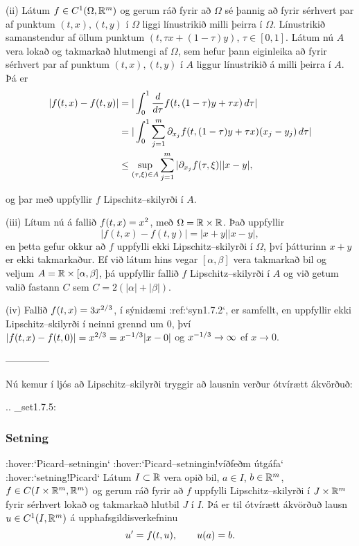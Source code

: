 \smallskip
(ii)  Látum $f\in C^{1}(\Omega,{\mathbb R}^m)$ og gerum ráð fyrir að $\Omega$ sé
þannig að fyrir sérhvert par af 
punktum $(t,x), (t,y)$ í $\Omega$  liggi línustrikið milli þeirra í $\Omega$.
Línustrikið  samanstendur af öllum punktum $(t,\tau x+(1-\tau)y)$,
$\tau\in [0,1]$. Látum nú $A$ vera lokað og takmarkað hlutmengi af
$\Omega$, sem hefur þann eiginleika að fyrir sérhvert par af punktum
$(t,x), (t,y)$ í $A$ liggur línustrikið á milli þeirra í $A$.  Þá er
\begin{align*}
|f(t,x)-f(t,y)|&=|\int_0\sp 1\dfrac d{d\tau}f(t,(1-\tau)y+\tau x) \,
d\tau|\\
&=|\int_0\sp 1 \sum\limits_{j=1}\sp m
\partial_{x_j}f(t,(1-\tau)y+\tau x)
(x_j-y_j) \, d\tau|\\
&\leq \sup\limits_{(\tau,\xi)\in A} 
\sum\limits_{j=1}\sp m |\partial_{x_j}f(\tau,\xi)||x-y|,
\end{align*}

\noindent
og þar með uppfyllir $f$ Lipschitz--skilyrði í $A$.

\smallskip
(iii)  Lítum nú á fallið $f(t,x)=x\sp 2$, með $\Omega={\mathbb R}\times {\mathbb R}$.
Það uppfyllir  $$|f(t,x)-f(t,y)|=|x+y||x-y|, 
 $$
en þetta gefur okkur að $f$ uppfylli ekki Lipschitz--skilyrði í $\Omega$, því
þátturinn $x+y$ er ekki takmarkaður.  Ef við látum hins vegar
$[\alpha,\beta]$ 
vera takmarkað bil og veljum $A={\mathbb R}\times [\alpha,\beta]$, þá
uppfyllir fallið $f$ Lipschitz--skilyrði í $A$ og við getum valið
fastann $C$ sem 
$C=2(|\alpha|+|\beta|)$.  

\smallskip
(iv) Fallið $f(t,x)=3x\sp{2/3}$, í sýnidæmi :ref:`syn1.7.2`, er samfellt, en
uppfyllir ekki
Lipschitz--skilyrði í neinni grennd um $0$, því
$|f(t,x)-f(t,0)|=x\sp{2/3}=x\sp{-1/3}|x-0|$ og $x\sp{-1/3}\to \infty$ ef
$x\to 0$.  


--------------



Nú kemur í ljós að Lipschitz--skilyrði tryggir að lausnin verður
ótvírætt ákvörð\-uð:


.. _set1.7.5:

\subsubsection{Setning}{ :hover:`Picard--setningin` :hover:`Picard--setningin!víðfeðm
útgáfa` :hover:`setning!Picard`}
Látum $I\subset {\mathbb R}$ vera opið bil, $a\in I$, $b\in {\mathbb R}\sp m$,
$f\in C(I\times {\mathbb R}\sp m,{\mathbb R}\sp m)$ og gerum ráð fyrir að $f$ uppfylli
Lipschitz--skilyrði í $J\times {\mathbb R}\sp m$ fyrir sérhvert lokað og
takmarkað hlutbil $J$ í $I$. Þá er til ótvírætt ákvörðuð lausn 
$u\in C\sp 1(I,{\mathbb R}\sp m)$ á upphafsgildisverkefninu
 $$u{\sp{\prime}}=f(t,u), \qquad u(a)=b.
 $$


